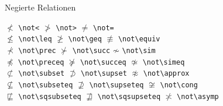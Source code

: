 \begin{table}[!htbp]
\caption{Negierte Relationen}
\begin{symbols}
$\not< $\> \lstinline|\not<| \>$\not> $\> \lstinline|\not>| \>$\not= $\> \lstinline|\not=| \\
$\not\leq $\> \lstinline|\not\leq| \>$\not\geq $\> \lstinline|\not\geq| \>
  $\not\equiv $\> \lstinline|\not\equiv| \\
$\not\prec $\> \lstinline|\not\prec| \>$\not\succ $\> \lstinline|\not\succ| \>
  $\not\sim $\> \lstinline|\not\sim| \\
$\not\preceq $\> \lstinline|\not\preceq| \>$\not\succeq $\> \lstinline|\not\succeq| \>
  $\not\simeq $\> \lstinline|\not\simeq| \\
$\not\subset $\> \lstinline|\not\subset| \>$\not\supset $\> \lstinline|\not\supset| \>
  $\not\approx $\> \lstinline|\not\approx| \\
$\not\subseteq $\> \lstinline|\not\subseteq| \>$\not\supseteq $\>
\lstinline|\not\supseteq| \>
  $\not\cong $\> \lstinline|\not\cong| \\
$\not\sqsubseteq $\> \lstinline|\not\sqsubseteq| \>$\not\sqsupseteq $\>
\lstinline|\not\sqsupseteq| \>
  $\not\asymp $\> \lstinline|\not\asymp| \\
\end{symbols}
\end{table}


